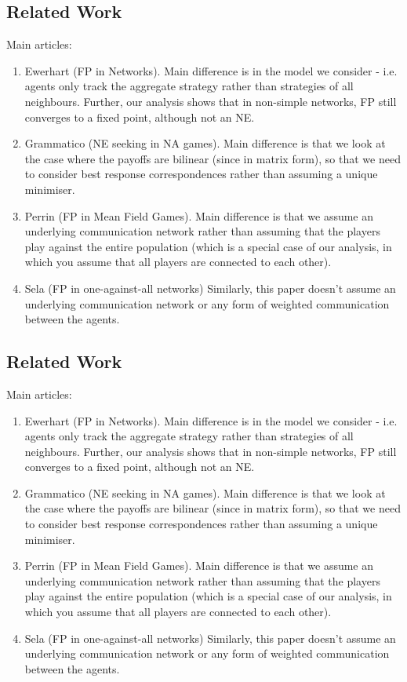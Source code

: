 \documentclass{article}
\theoremstyle{definition}
\begin{document}
	\subsection{Related Work}
		Main articles: 
		\begin{enumerate}
			\item Ewerhart (FP in Networks). Main difference is in the model we consider - i.e. agents only track the aggregate strategy rather than strategies of all neighbours. Further, our analysis shows that in non-simple networks, FP still converges to a fixed point, although not an NE.
			\item Grammatico (NE seeking in NA games). Main difference is that we look at the case where the payoffs are bilinear (since in matrix form), so that we need to consider best response correspondences rather than assuming a unique minimiser.
			\item Perrin (FP in Mean Field Games). Main difference is that we assume an underlying communication network rather than assuming that the players play against the entire population (which is a special case of our analysis, in which you assume that all players are connected to each other).
			\item Sela (FP in one-against-all networks) Similarly, this paper doesn't assume an underlying communication network or any form of weighted communication between the agents.
		\end{enumerate}
		\subsection{Related Work}
					Main articles: 
					\begin{enumerate}
						\item Ewerhart (FP in Networks). Main difference is in the model we consider - i.e. agents only track the aggregate strategy rather than strategies of all neighbours. Further, our analysis shows that in non-simple networks, FP still converges to a fixed point, although not an NE.
						\item Grammatico (NE seeking in NA games). Main difference is that we look at the case where the payoffs are bilinear (since in matrix form), so that we need to consider best response correspondences rather than assuming a unique minimiser.
						\item Perrin (FP in Mean Field Games). Main difference is that we assume an underlying communication network rather than assuming that the players play against the entire population (which is a special case of our analysis, in which you assume that all players are connected to each other).
						\item Sela (FP in one-against-all networks) Similarly, this paper doesn't assume an underlying communication network or any form of weighted communication between the agents.
					\end{enumerate}
                
\end{document}
